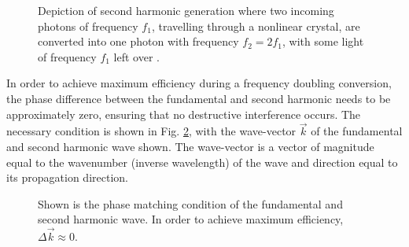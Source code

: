 
\begin{figure}[ht!]
  \centering
  
  \caption{Depiction of second harmonic generation where two incoming photons of frequency $f_1$, travelling through a nonlinear crystal, are converted into one photon with frequency $f_2 = 2f_1$, with some light of frequency $f_1$ left over \protect\cite{SHG}.}
  \label{fig:SHG}
\end{figure}

In order to achieve maximum efficiency during a frequency doubling conversion, the phase difference between the fundamental and second harmonic needs to be approximately zero, ensuring that no destructive interference occurs. The necessary condition is shown in Fig. \ref{fig:phasematching}, with the wave-vector $\vec{k}$ of the fundamental and second harmonic wave shown. The wave-vector is a vector of magnitude equal to the wavenumber (inverse wavelength) of the wave and direction equal to its propagation direction.



\begin{figure}[h]
  \centering
  
  \caption{Shown is the phase matching condition of the fundamental and second harmonic wave. In order to achieve maximum efficiency, $\Delta \vec k \approx 0$.}
  \label{fig:phasematching}
\end{figure}


